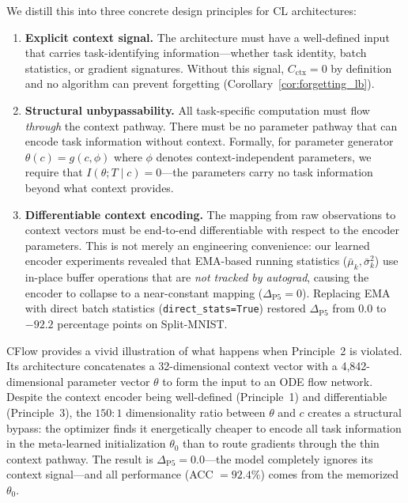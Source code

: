 \documentclass{article}
\begin{document}
We distill this into three concrete design principles for CL architectures:

\begin{enumerate}
    \item \textbf{Explicit context signal.} The architecture must have a well-defined input that carries task-identifying information---whether task identity, batch statistics, or gradient signatures. Without this signal, $C_\mathrm{ctx} = 0$ by definition and no algorithm can prevent forgetting (Corollary~\ref{cor:forgetting_lb}).

    \item \textbf{Structural unbypassability.} All task-specific computation must flow \emph{through} the context pathway. There must be no parameter pathway that can encode task information without context. Formally, for parameter generator $\theta(c) = g(c, \phi)$ where $\phi$ denotes context-independent parameters, we require that $I(\theta; T \mid c) = 0$---the parameters carry no task information beyond what context provides.

    \item \textbf{Differentiable context encoding.} The mapping from raw observations to context vectors must be end-to-end differentiable with respect to the encoder parameters. This is not merely an engineering convenience: our learned encoder experiments revealed that EMA-based running statistics ($\bar{\mu}_k, \bar{\sigma}_k^2$) use in-place buffer operations that are \emph{not tracked by autograd}, causing the encoder to collapse to a near-constant mapping ($\Delta_\mathrm{P5} = 0$). Replacing EMA with direct batch statistics (\texttt{direct\_stats=True}) restored $\Delta_\mathrm{P5}$ from $0.0$ to $-92.2$ percentage points on Split-MNIST.
\end{enumerate}

CFlow \citep{neuraldrift2026cflow} provides a vivid illustration of what happens when Principle~2 is violated. Its architecture concatenates a 32-dimensional context vector with a 4,842-dimensional parameter vector $\theta$ to form the input to an ODE flow network. Despite the context encoder being well-defined (Principle~1) and differentiable (Principle~3), the $150{:}1$ dimensionality ratio between $\theta$ and $c$ creates a structural bypass: the optimizer finds it energetically cheaper to encode all task information in the meta-learned initialization $\theta_0$ than to route gradients through the thin context pathway. The result is $\Delta_\mathrm{P5} = 0.0$---the model completely ignores its context signal---and all performance (ACC $= 92.4\%$) comes from the memorized $\theta_0$.
\end{document}
